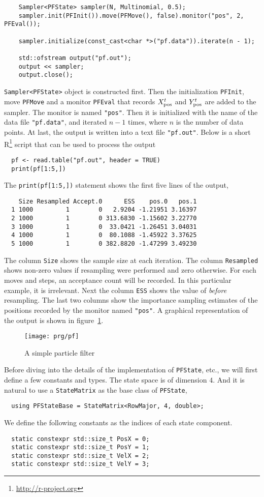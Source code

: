 \begin{Verbatim}
    Sampler<PFState> sampler(N, Multinomial, 0.5);
    sampler.init(PFInit()).move(PFMove(), false).monitor("pos", 2, PFEval());

    sampler.initialize(const_cast<char *>("pf.data")).iterate(n - 1);

    std::ofstream output("pf.out");
    output << sampler;
    output.close();
\end{Verbatim}
\verb|Sampler<PFState>| object is constructed first. Then the initialization
\verb|PFInit|, move \verb|PFMove| and a monitor \verb|PFEval| that records
$X_{\mathrm{pos}}^t$ and $Y_{\mathrm{pos}}^t$ are added to the sampler. The monitor is named
\verb|"pos"|. Then it is initialized with the name of the data file
\verb|"pf.data"|, and iterated $n - 1$ times, where $n$ is the number of data
points. At last, the output is written into a text file \verb|"pf.out"|. Below
is a short R\footnote{\url{http://r-project.org}} script that can be used to
process the output
\begin{Verbatim}
  pf <- read.table("pf.out", header = TRUE)
  print(pf[1:5,])
\end{Verbatim}
The \verb|print(pf[1:5,])| statement shows the first five lines of the output,
\begin{Verbatim}
    Size Resampled Accept.0      ESS    pos.0   pos.1
  1 1000         1        0   2.9204 -1.21951 3.16397
  2 1000         1        0 313.6830 -1.15602 3.22770
  3 1000         1        0  33.0421 -1.26451 3.04031
  4 1000         1        0  80.1088 -1.45922 3.37625
  5 1000         1        0 382.8820 -1.47299 3.49230
\end{Verbatim}
The column \verb|Size| shows the sample size at each iteration. The column
\verb|Resampled| shows non-zero values if resampling were performed and zero
otherwise. For each moves and \mcmc steps, an acceptance count will be
recorded. In this particular example, it is irrelevant. Next the column
\verb|ESS| shows the value of \ess \emph{before} resampling. The last two
columns show the importance sampling estimates of the positions recorded by the
monitor named \verb|"pos"|. A graphical representation of the output is shown
in figure~\ref{fig:pf}.

\begin{figure}
  \texttt{[image: prg/pf]}
  \caption{A simple particle filter}
  \label{fig:pf}
\end{figure}

Before diving into the details of the implementation of \verb|PFState|, etc.,
we will first define a few constants and types. The state space is of dimension
$4$. And it is natural to use a \verb|StateMatrix| as the base class of
\verb|PFState|,
\begin{Verbatim}
  using PFStateBase = StateMatrix<RowMajor, 4, double>;
\end{Verbatim}
We define the following constants as the indices of each state component.
\begin{Verbatim}
  static constexpr std::size_t PosX = 0;
  static constexpr std::size_t PosY = 1;
  static constexpr std::size_t VelX = 2;
  static constexpr std::size_t VelY = 3;
\end{Verbatim}

